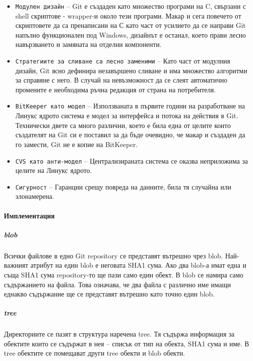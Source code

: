 \documentclass[a4paper]{article}
\begin{document}
\begin{itemize}
      \item \texttt{Модулен дизайн} -- Git е създаден като множество програми на C, свързани с shell скриптове - wrapper-и около тези програми. Макар и сега повечето от скриптовете да са пренаписани на С като част от усилието да се направи Git напълно функционален под Windows, дизайнът е останал, което прави лесно навързването и замяната на отделни компоненти.
      \item \texttt{Стратегиите за сливане са лесно заменими} -- Като част от модулния дизайн, Git ясно дефинира незавършено сливане и има множество алгоритми за справяне с него. В случай на невъзможност да се слеят автоматично промените е необходима ръчна редакция от страна на потребителя.
      \item \texttt{BitKeeper\cite{BitKeeper} като модел} -- Използваната в първите години на разработване на Линукс ядрото система е модел за интерфейса и потока на действия в Git. Технически двете са много различни, което е била една от целите които създателят на Git си е поставил за да бъде очевидно, че макар и създаден да го замести, Git не е копие на BitKeeper.
      \item \texttt{CVS като анти-модел} -- Централизираната система се оказва неприложима за целите на Линукс ядрото.
      \item \texttt{Сигурност} -- Гаранции срещу повреда на данните, била тя случайна или злонамерена.
    \end{itemize}

    \paragraph{Имплементация}
      
      \subparagraph{blob}
      Всички файлове в едно Git repository се представят вътрешно чрез blob.
      Най-важният атрибут на един blob е неговата SHA1 сума. Ако два blob-а
      имат една и съща SHA1 сума repository-то ще пази само един обект.  В blob
      се намира само съдържанието на файла. Това означава, че два файла
      с различно име имащи еднакво съдържание ще се представят вътрешно като
      точно един blob.

      \subparagraph{tree}
      Директориите се пазят в структура наречена tree. Тя съдържа информация за
      обектите които се съдържат в нея -- списък от тип на обекта, SHA1 сума
      и име. В tree обектите се помещават други tree обекти и blob обекти.
\end{document}
